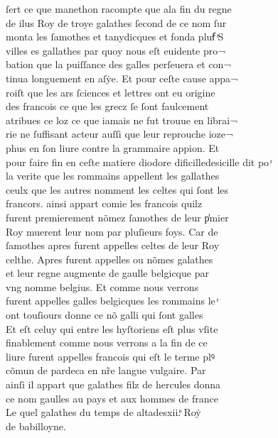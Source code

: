 \documentclass[12pt]{article}
\begin{document}
\newpage
ſert ce que manethon racompte que ala fin du regne\\
de ilus Roy de troye galathes ſecond de ce nom ſur\\
monta les ſamothes et tanydicques et fonda pluẜ ͬS\\
villes es gallathes par
          quoy nous eſt euidente pro¬\\
bation que la puiſſance des galles perſeuera et
            con¬\\
tinua longuement en aſẏe. Et pour ceſte cause appa¬\\
roiſt que
          les ars ſciences et lettres ont eu origine\\
des francois ce que les grecz ſe ſont
            faulcement\\
atribues ce loz ce que iamais ne fut trouue en librai¬\\
rie ne ſuffisant acteur auſſi que leur reprouche ioze¬\\
phus en ſon liure contre la grammaire appion.
            Et\\
pour faire fin en ceſte matiere diodore dificilledesicille dit po ͬ\\
la verite que les rommains appellent les gallathes\\
ceulx que les autres nomment les celtes qui ſont les\\
francors. ainsi appart
          comie les francois quilz\\
furent premierement nõmez ſamothes de leur p̾mier\\
Roy muerent leur nom par pluſieurs foys. Car de\\
ſamothes apres furent
          appelles celtes de leur Roy\\
celthe. Apres
          furent appelles ou nõmes galathes\\
et leur regne augmente de gaulle belgicque
            par\\
vng nomme belgius.
          Et comme nous verrons\\
furent appelles galles belgicques les rommains le ͬ\\
ont touſiours donne ce nõ galli qui ſont galles\\
Et eſt celuy qui
          entre les hyſtoriens eſt plus vſite\\
finablement comme nous verrons a la fin de
            ce\\
liure furent appelles francois qui eſt le terme plꝰ\\
cõmun de
          pardeca en nr̃e langue vulgaire. Par\\
ainſi il appart que galathes filz de hercules donna\\
ce nom gaulles au pays et aux hommes de france\\
Le quel galathes du temps de altadesxii.ͤ Roẏ\\
de babilloyne.
\end{document}
